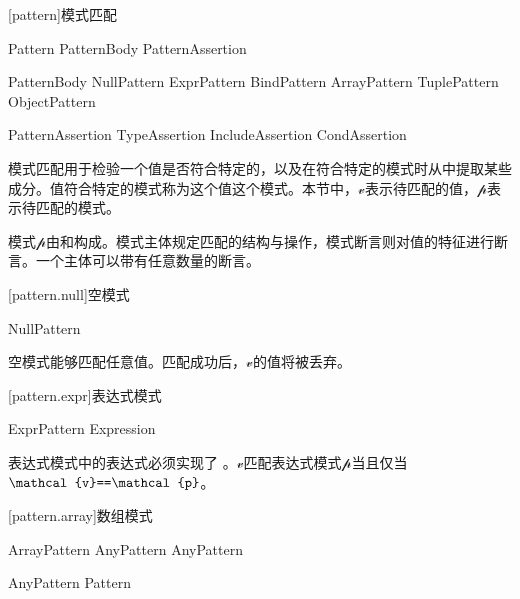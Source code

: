 
[pattern]{模式匹配}

\begin{bnf}{Pattern}
    PatternBody PatternAssertion\bnfs
\end{bnf}

\begin{bnf}{PatternBody}
    NullPattern \br
    ExprPattern \br
    BindPattern \br
    ArrayPattern \br
    TuplePattern \br
    ObjectPattern
\end{bnf}

\begin{bnf}{PatternAssertion}
    TypeAssertion \br
    IncludeAssertion \br
    CondAssertion
\end{bnf}

\pnum
模式匹配用于检验一个值是否符合特定的，以及在符合特定的模式时从中提取某些成分。值符合特定的模式称为这个值这个模式。本节中，$\mathcal{v}$表示待匹配的值，$\mathcal{p}$表示待匹配的模式。

\pnum
模式$\mathcal{p}$由和构成。模式主体规定匹配的结构与操作，模式断言则对值的特征进行断言。一个主体可以带有任意数量的断言。

[pattern.null]{空模式}

\begin{bnf}{NullPattern}
    \tcode{_}
\end{bnf}

\pnum
空模式能够匹配任意值。匹配成功后，$\mathcal{v}$的值将被丢弃。

[pattern.expr]{表达式模式}

\begin{bnf}{ExprPattern}
    Expression
\end{bnf}

\pnum
表达式模式中的表达式必须实现了 。$\mathcal{v}$匹配表达式模式$\mathcal{p}$当且仅当$\mathcal{v}\tcode{==}\mathcal{p}$。

[pattern.array]{数组模式}

\begin{bnf}{ArrayPattern}
    \terminal{[} AnyPattern \bnflp\terminal{,} AnyPattern\bnfrp\bnfs\ \terminal{]}
\end{bnf}

\begin{bnf}{AnyPattern}
    Pattern\br
\end{bnf}

